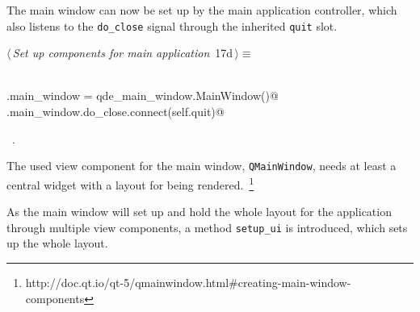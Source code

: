 \documentclass[
    a4paper,      %
    10pt,         %
    openright,    %
    notitlepage,  %
    parskip=half, %
]{scrreprt}       %
\theoremstyle{definition}                    %
\begin{document}
The main window can now be set up by the main application controller, which also
listens to the \verb=do_close= signal through the inherited \verb=quit= slot.

\begin{flushleft} \small
\begin{minipage}{\linewidth}\label{scrap11}\raggedright\small
{} $\langle\,${\itshape Set up components for main application}\nobreak\ {\footnotesize {17d}}$\,\rangle\equiv$
\vspace{-1ex}
\begin{list}{}{} \item
\mbox{}\lstinline@@\\
\mbox{}\lstinline@self.main_window = qde_main_window.MainWindow()@\\
\mbox{}\lstinline@self.main_window.do_close.connect(self.quit)@\\
\mbox{}\lstinline@@{\NWsep}
\end{list}
\vspace{-1.5ex}
\footnotesize
\begin{list}{}{\setlength{\itemsep}{-\parsep}\setlength{\itemindent}{-\leftmargin}}
\item \NWtxtMacroRefIn\ .

\item{}
\end{list}
\end{minipage}\vspace{4ex}
\end{flushleft}
The used view component for the main window, \verb+QMainWindow+, needs at least
a central widget with a layout for being
rendered.~\footnote{http://doc.qt.io/qt-5/qmainwindow.html\#creating-main-window-components}

As the main window will set up and hold the whole layout for the application
through multiple view components, a method \verb+setup_ui+ is introduced, which
sets up the whole layout.
\end{document}
